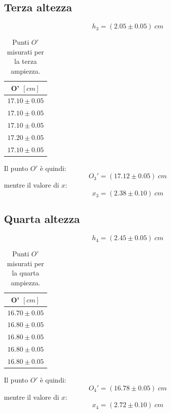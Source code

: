 \subsection{Terza altezza}
\begin{equation}
	h_3=(2.05\pm0.05)\ cm
\end{equation}

\begin{table}[H]
	\centering
	\begin{tabular}{|c|}
		\hline
		\textbf{O' $[cm]$} \\
		\hline
		$17.10\pm 0.05$ \\
		$17.10\pm 0.05$ \\
		$17.10\pm 0.05$ \\
		$17.20\pm 0.05$ \\
		$17.10\pm 0.05$ \\
		\hline
	\end{tabular}
	\caption{Punti $O'$ misurati per la terza ampiezza.}
	\label{tab:}
\end{table}

Il punto $O'$ è quindi:
\begin{equation}
	O_3'=(17.12\pm0.05)\ cm
\end{equation}
mentre il valore di $x$:
\begin{equation}
	x_3=(2.38\pm 0.10)\ cm
\end{equation}

\subsection{Quarta altezza}
\begin{equation}
	h_4=(2.45\pm0.05)\ cm
\end{equation}

\begin{table}[H]
	\centering
	\begin{tabular}{|c|}
		\hline
		\textbf{O' $[cm]$} \\
		\hline
		$16.70\pm 0.05$ \\
		$16.80\pm 0.05$ \\
		$16.80\pm 0.05$ \\
		$16.80\pm 0.05$ \\
		$16.80\pm 0.05$ \\
		\hline
	\end{tabular}
	\caption{Punti $O'$ misurati per la quarta ampiezza.}
	\label{tab:}
\end{table}

Il punto $O'$ è quindi:
\begin{equation}
	O_4'=(16.78\pm0.05)\ cm
\end{equation}
mentre il valore di $x$:
\begin{equation}
	x_4=(2.72\pm 0.10)\ cm
\end{equation}

